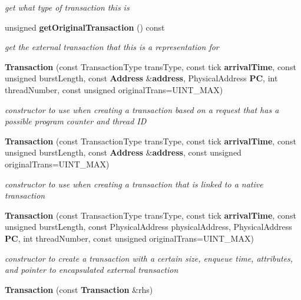 \begin{CompactItemize}
\begin{CompactList}\small\item\em get what type of transaction this is \item\end{CompactList}\item 
unsigned {\bf getOriginalTransaction} () const \label{class_d_r_a_msim_i_i_1_1_transaction_e7a386db95dd3b642b05029d7002a401}

\begin{CompactList}\small\item\em get the external transaction that this is a representation for \item\end{CompactList}\item 
{\bf Transaction} (const TransactionType transType, const tick {\bf arrivalTime}, const unsigned burstLength, const {\bf Address} \&{\bf address}, PhysicalAddress {\bf PC}, int threadNumber, const unsigned originalTrans=UINT\_\-MAX)\label{class_d_r_a_msim_i_i_1_1_transaction_5c1c99a53ce9d4a799f245268d2dc537}

\begin{CompactList}\small\item\em constructor to use when creating a transaction based on a request that has a possible program counter and thread ID \item\end{CompactList}\item 
{\bf Transaction} (const TransactionType transType, const tick {\bf arrivalTime}, const unsigned burstLength, const {\bf Address} \&{\bf address}, const unsigned originalTrans=UINT\_\-MAX)\label{class_d_r_a_msim_i_i_1_1_transaction_fbd63f694ace99a07fa448160507064f}

\begin{CompactList}\small\item\em constructor to use when creating a transaction that is linked to a native transaction \item\end{CompactList}\item 
{\bf Transaction} (const TransactionType transType, const tick {\bf arrivalTime}, const unsigned burstLength, const PhysicalAddress physicalAddress, PhysicalAddress {\bf PC}, int threadNumber, const unsigned originalTrans=UINT\_\-MAX)\label{class_d_r_a_msim_i_i_1_1_transaction_d01bf6da8c4f48a704fd0ba444a4475c}

\begin{CompactList}\small\item\em constructor to create a transaction with a certain size, enqueue time, attributes, and pointer to encapsulated external transaction \item\end{CompactList}\item 
{\bf Transaction} (const {\bf Transaction} \&rhs)\label{class_d_r_a_msim_i_i_1_1_transaction_bf61afbd5abc7698fc59e9ee86f620a7}


\end{CompactItemize}
